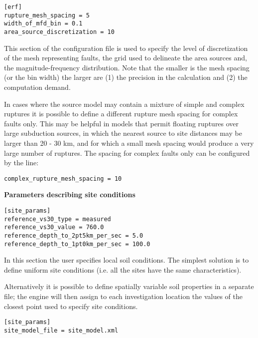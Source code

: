 \begin{verbatim}
[erf]
rupture_mesh_spacing = 5
width_of_mfd_bin = 0.1
area_source_discretization = 10
\end{verbatim}

This section of the configuration file is used to specify the level of
discretization of the mesh representing faults, the grid used to delineate the area sources and, the magnitude-frequency distribution. Note that the smaller is the mesh spacing (or the bin width) the larger are (1) the precision in the calculation and (2) the computation demand.

In cases where the source model may contain a mixture of simple and complex ruptures it is possible to define a different rupture mesh spacing for complex faults only. This may be helpful in models that permit floating ruptures over large subduction sources, in which the nearest source to site distances may be larger than 20 - 30 km, and for which a small mesh spacing would produce a very large number of ruptures. The spacing for complex faults only can be configured by the line:

\begin{verbatim}
complex_rupture_mesh_spacing = 10
\end{verbatim}

\textbf{Parameters describing site conditions}

\begin{verbatim}
[site_params]
reference_vs30_type = measured
reference_vs30_value = 760.0
reference_depth_to_2pt5km_per_sec = 5.0
reference_depth_to_1pt0km_per_sec = 100.0
\end{verbatim}

In this section the user specifies local soil conditions. The simplest
solution is to define uniform site conditions (i.e. all the sites have  the
same characteristics).

Alternatively it is possible to define  spatially variable soil properties in
a separate file; the engine will then assign to each investigation location
the values of the closest point used to specify site conditions.

\begin{verbatim}
[site_params]
site_model_file = site_model.xml
\end{verbatim}

